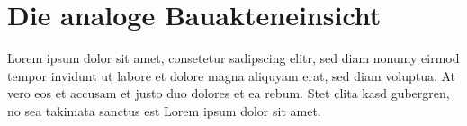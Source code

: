 \section{Die analoge Bauakteneinsicht}\label{Die analoge Bauakteneinsicht}

Lorem ipsum dolor sit amet, consetetur sadipscing elitr, sed diam nonumy eirmod tempor invidunt ut labore et dolore magna aliquyam erat, sed diam voluptua. At vero eos et accusam et justo duo dolores et ea rebum. Stet clita kasd gubergren, no sea takimata sanctus est Lorem ipsum dolor sit amet.







